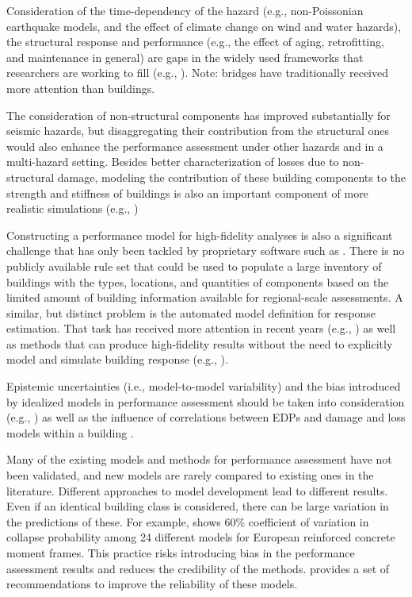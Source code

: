 Consideration of the time-dependency of the hazard (e.g., non-Poissonian earthquake models, and the effect of climate change on wind and water hazards), the structural response and performance (e.g., the effect of aging, retrofitting, and maintenance in general) are gaps in the widely used frameworks that researchers are working to fill (e.g., \cite{gavrilovic2020multi, choe2008probabilistic, pitilakis2014consideration}). Note: bridges have traditionally received more attention than buildings.

The consideration of non-structural components has improved substantially for seismic hazards, but disaggregating their contribution from the structural ones would also enhance the performance assessment under other hazards and in a multi-hazard setting. Besides better characterization of losses due to non-structural damage, modeling the contribution of these building components to the strength and stiffness of buildings is also an important component of more realistic simulations (e.g., \cite{filiatrault2014performance, welch2016nonstructural})

Constructing a performance model for high-fidelity analyses is also a significant challenge that has only been tackled by proprietary software such as . There is no publicly available rule set that could be used to populate a large inventory of buildings with the types, locations, and quantities of components based on the limited amount of building information available for regional-scale assessments. A similar, but distinct problem is the automated model definition for response estimation. That task has received more attention in recent years (e.g., \cite{guan2020python, xiong2016nonlinear}) as well as methods that can produce high-fidelity results without the need to explicitly model and simulate building response (e.g., \cite{zou2020surrogate}).

Epistemic uncertainties (i.e., model-to-model variability) and the bias introduced by idealized models in performance assessment should be taken into consideration (e.g., \cite{aslani2005probability, schotanus2004seismic}) as well as the influence of correlations between EDPs \citep{shome2009comparison} and damage and loss models within a building \citep{ramirez2009building}.

Many of the existing models and methods for performance assessment have not been validated, and new models are rarely compared to existing ones in the literature. Different approaches to model development lead to different results. Even if an identical building class is considered, there can be large variation in the predictions of these. For example, \citet{crowley2014epistemic} shows 60\% coefficient of variation in collapse probability among 24 different models for European reinforced concrete moment frames. This practice risks introducing bias in the performance assessment results and reduces the credibility of the methods. \citet{silva2019current} provides a set of recommendations to improve the reliability of these models.

